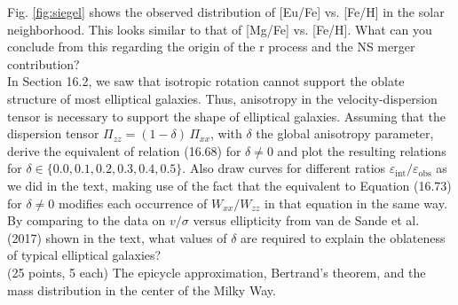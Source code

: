 \documentclass[12pt]{article}
\begin{document}
Fig. \ref{fig:siegel} shows the observed distribution of [Eu/Fe]
vs. [Fe/H] in the solar neighborhood. This looks similar to that of
[Mg/Fe] vs. [Fe/H]. What can you conclude from this regarding the
origin of the r process and the NS merger contribution?\\

 In Section 16.2, we saw that isotropic rotation
cannot support the oblate structure of most elliptical galaxies. Thus,
anisotropy in the velocity-dispersion tensor is necessary to support
the shape of elliptical galaxies. Assuming that the dispersion tensor
$\Pi_{zz} = (1-\delta)\,\Pi_{xx}$, with $\delta$ the global
anisotropy parameter, derive the equivalent of relation (16.68) for
$\delta \neq 0$ and plot the resulting relations for $\delta \in
\{0.0,0.1,0.2,0.3,0.4,0.5\}$. Also draw curves for different ratios
$\varepsilon_{\mathrm{int}}/\varepsilon_{\mathrm{obs}}$ as we did in
the text, making use of the fact that the equivalent to Equation
(16.73) for $\delta \neq 0$ modifies each occurrence of
$W_{xx}/W_{zz}$ in that equation in the same way. By comparing to the
data on $v/\sigma$ versus ellipticity from van de Sande et al. (2017)
shown in the text, what values of $\delta$ are required to explain the
oblateness of typical elliptical galaxies?\\

 (25 points, 5 each) The epicycle
approximation, Bertrand's theorem, and the mass distribution in the
center of the Milky Way.\\
\end{document}
